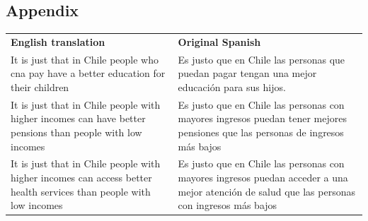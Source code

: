 \documentclass[
  letterpaper,
  DIV=11,
  numbers=noendperiod]{scrartcl}
\begin{document}
\subsection{Appendix}\label{appendix}

\begin{longtable}[]{@{}
  >{\raggedright\arraybackslash}p{}
  >{\raggedright\arraybackslash}p{}@{}}
\toprule\noalign{}
\endhead
\bottomrule\noalign{}
\endlastfoot
\textbf{English translation} & \textbf{Original Spanish} \\
It is just that in Chile people who cna pay have a better education for
their children & Es justo que en Chile las personas que puedan pagar
tengan una mejor educación para sus hijos. \\
It is just that in Chile people with higher incomes can have better
pensions than people with low incomes & Es justo que en Chile las
personas con mayores ingresos puedan tener mejores pensiones que las
personas de ingresos más bajos \\
It is just that in Chile people with higher incomes can access better
health services than people with low incomes & Es justo que en Chile las
personas con mayores ingresos puedan acceder a una mejor atención de
salud que las personas con ingresos más bajos \\
\end{longtable}
\end{document}
